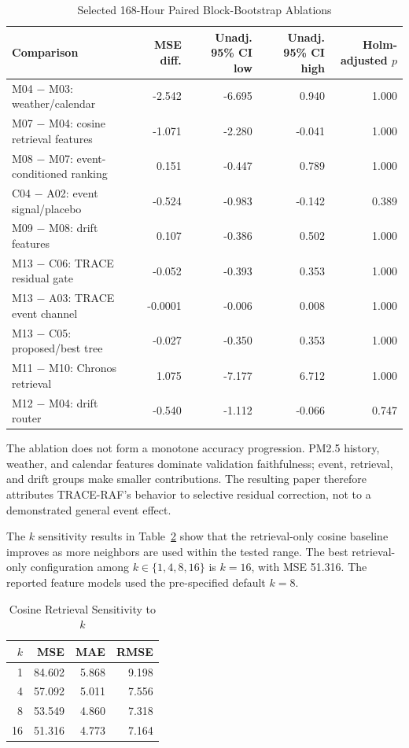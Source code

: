 \documentclass{ieeeaccess}
\begin{document}
\begin{table}[!t]
\centering
\caption{Selected 168-Hour Paired Block-Bootstrap Ablations}
\label{tab:ablation_results}
\begin{tabular}{lrrrr}
\toprule
Comparison & MSE diff. & Unadj. 95\% CI low & Unadj. 95\% CI high & Holm-adjusted $p$ \\
\midrule
M04 $-$ M03: weather/calendar & -2.542 & -6.695 & 0.940 & 1.000 \\
M07 $-$ M04: cosine retrieval features & -1.071 & -2.280 & -0.041 & 1.000 \\
M08 $-$ M07: event-conditioned ranking & 0.151 & -0.447 & 0.789 & 1.000 \\
C04 $-$ A02: event signal/placebo & -0.524 & -0.983 & -0.142 & 0.389 \\
M09 $-$ M08: drift features & 0.107 & -0.386 & 0.502 & 1.000 \\
M13 $-$ C06: TRACE residual gate & -0.052 & -0.393 & 0.353 & 1.000 \\
M13 $-$ A03: TRACE event channel & -0.0001 & -0.006 & 0.008 & 1.000 \\
M13 $-$ C05: proposed/best tree & -0.027 & -0.350 & 0.353 & 1.000 \\
M11 $-$ M10: Chronos retrieval & 1.075 & -7.177 & 6.712 & 1.000 \\
M12 $-$ M04: drift router & -0.540 & -1.112 & -0.066 & 0.747 \\
\bottomrule
\end{tabular}
\end{table}

The ablation does not form a monotone accuracy progression. PM2.5 history,
weather, and calendar features dominate validation faithfulness; event,
retrieval, and drift groups make smaller contributions. The resulting paper
therefore attributes TRACE-RAF's behavior to selective residual correction,
not to a demonstrated general event effect.

The $k$ sensitivity results in Table~\ref{tab:k_sensitivity} show that the
retrieval-only cosine baseline improves as more neighbors are used within the
tested range. The best retrieval-only configuration among $k \in \{1,4,8,16\}$
is $k=16$, with MSE 51.316. The reported feature models used the
pre-specified default $k=8$.

\begin{table}[!t]
\centering
\caption{Cosine Retrieval Sensitivity to $k$}
\label{tab:k_sensitivity}
\begin{tabular}{rrrr}
\toprule
$k$ & MSE & MAE & RMSE \\
\midrule
1 & 84.602 & 5.868 & 9.198 \\
4 & 57.092 & 5.011 & 7.556 \\
8 & 53.549 & 4.860 & 7.318 \\
16 & 51.316 & 4.773 & 7.164 \\
\bottomrule
\end{tabular}
\end{table}
\end{document}
